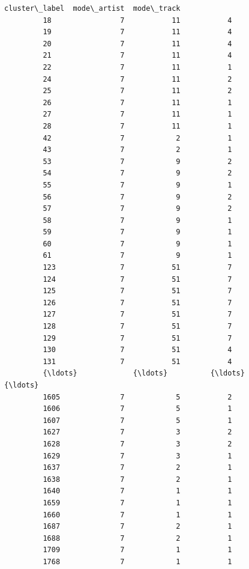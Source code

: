 \documentclass[11pt]{article}
\begin{document}
\begin{Verbatim}[commandchars=\\\{\}]
               cluster\_label  mode\_artist  mode\_track  
         18                7           11           4  
         19                7           11           4  
         20                7           11           4  
         21                7           11           4  
         22                7           11           1  
         24                7           11           2  
         25                7           11           2  
         26                7           11           1  
         27                7           11           1  
         28                7           11           1  
         42                7            2           1  
         43                7            2           1  
         53                7            9           2  
         54                7            9           2  
         55                7            9           1  
         56                7            9           2  
         57                7            9           2  
         58                7            9           1  
         59                7            9           1  
         60                7            9           1  
         61                7            9           1  
         123               7           51           7  
         124               7           51           7  
         125               7           51           7  
         126               7           51           7  
         127               7           51           7  
         128               7           51           7  
         129               7           51           7  
         130               7           51           4  
         131               7           51           4  
         {\ldots}             {\ldots}          {\ldots}         {\ldots}  
         1605              7            5           2  
         1606              7            5           1  
         1607              7            5           1  
         1627              7            3           2  
         1628              7            3           2  
         1629              7            3           1  
         1637              7            2           1  
         1638              7            2           1  
         1640              7            1           1  
         1659              7            1           1  
         1660              7            1           1  
         1687              7            2           1  
         1688              7            2           1  
         1709              7            1           1  
         1768              7            1           1  

\end{Verbatim}
\end{document}
